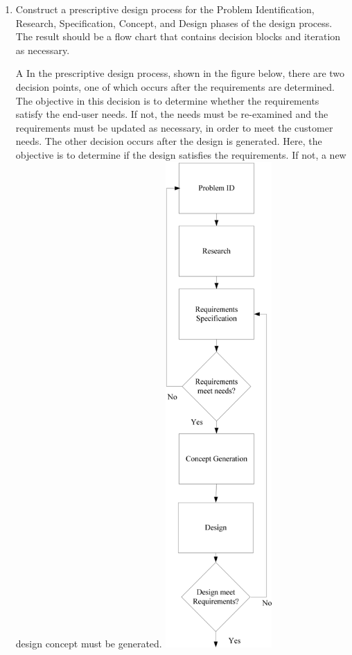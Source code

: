 \begin{enumerate}
\item
  Construct a prescriptive design process for the Problem
  Identification, Research, Specification, Concept, and Design phases of
  the design process. The result should be a flow chart that contains
  decision blocks and iteration as necessary.\\
\begin{solution}{A}{
In the prescriptive design process, shown in the figure below, there are two decision points,
one of which occurs after the requirements are determined. The objective in this decision is
to determine whether the requirements satisfy the end-user needs. If not, the needs must be
re-examined and the requirements must be updated as necessary, in order to meet the
customer needs. The other decision occurs after the design is generated. Here, the objective
is to determine if the design satisfies the requirements. If not, a new design concept must be
generated.
\includegraphics[width=1.6in,height=7.3in]{./chapter01/FigSolutions/image19}
}
\end{solution}
  

\end{enumerate}
